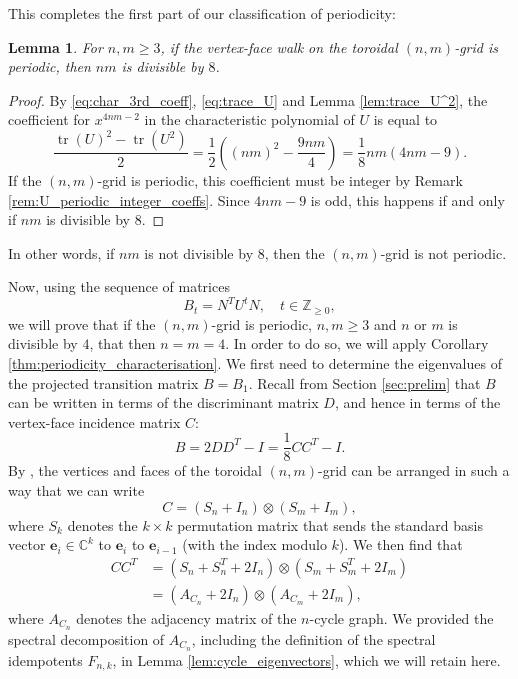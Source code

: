 \documentclass{article}
\newtheorem{lemma}[theorem]{Lemma}
\numberwithin{equation}{section}
\DeclareMathOperator\tr{tr}
\newcommand\cx{{\mathbb C}}%
\newcommand\ints{{\mathbb Z}}
\newcommand\Ze{{\mathbf e}}
\begin{document}
This completes the first part of our classification of periodicity:

\begin{lemma}
\label{lem:periodic_implies_div8}
For $n,m \geq 3$, if the vertex-face walk on the toroidal $(n,m)$-grid is periodic, then $nm$ is divisible by $8$.
\end{lemma}
\begin{proof}
By \eqref{eq:char_3rd_coeff}, \eqref{eq:trace_U} and Lemma \ref{lem:trace_U^2}, the coefficient for $x^{4nm - 2}$ in the characteristic polynomial of $U$ is equal to
\[
\frac{\tr(U)^2 - \tr(U^2)}{2} = \frac{1}{2}\left((nm)^2 - \frac{9nm}{4}\right) = \frac{1}{8}nm(4nm - 9).
\]
If the $(n,m)$-grid is periodic, this coefficient must be integer by Remark \ref{rem:U_periodic_integer_coeffs}. Since $4nm - 9$ is odd, this happens if and only if $nm$ is divisible by $8$.
\end{proof}
\noindent In other words, if $nm$ is not divisible by $8$, then the $(n,m)$-grid is not periodic.

Now, using the sequence of matrices
\[
B_t = N^T U^t N, \quad t \in \ints_{\geq 0},
\]
we will prove that if the $(n,m)$-grid is periodic, $n,m \geq 3$ and $n$ or $m$ is divisible by $4$, that then $n = m = 4$. In order to do so, we will apply Corollary \ref{thm:periodicity_characterisation}. We first need to determine the eigenvalues of the projected transition matrix $B = B_1$. Recall from Section \ref{sec:prelim} that $B$ can be written in terms of the discriminant matrix $D$, and hence in terms of the vertex-face incidence matrix $C$:
\begin{equation}
\label{eq:B_CCT}
B = 2DD^T - I = \frac{1}{8}CC^T - I.
\end{equation}
By \cite[Lemma 6.2]{GuoSch2024}, the vertices and faces of the toroidal $(n,m)$-grid can be arranged in such a way that we can write
\[
C = (S_n + I_n) \otimes (S_m + I_m),
\]
where $S_k$ denotes the $k \times k$ permutation matrix that sends the standard basis vector $\Ze_{i} \in \cx^{k}$ to $\Ze_{i}$ to $\Ze_{i-1}$ (with the index modulo $k$). We then find that
\begin{align}
\nonumber CC^T &= (S_n + S_n^T + 2I_n) \otimes (S_m + S_m^T + 2I_m) \\
\label{eq:CCT_expression} &= (A_{C_n} + 2I_n) \otimes (A_{C_m} + 2I_m),
\end{align}
where $A_{C_n}$ denotes the adjacency matrix of the $n$-cycle graph. We provided the spectral decomposition of $A_{C_n}$, including the definition of the spectral idempotents $F_{n,k}$, in Lemma \ref{lem:cycle_eigenvectors}, which we will retain here. 
\end{document}
